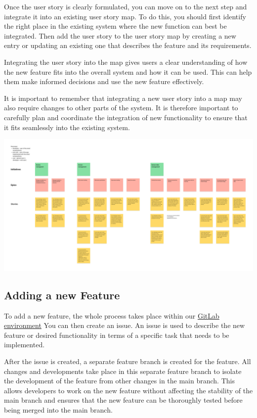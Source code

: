 \documentclass[12pt]{article}
\newcounter{fr}
\begin{document}
Once the user story is clearly formulated, you can move on to the next step and integrate it into an existing user story map. To do this, you should first identify the right place in the existing system where the new function can best be integrated. Then add the user story to the user story map by creating a new entry or updating an existing one that describes the feature and its requirements.

Integrating the user story into the map gives users a clear understanding of how the new feature fits into the overall system and how it can be used. This can help them make informed decisions and use the new feature effectively.

It is important to remember that integrating a new user story into a map may also require changes to other parts of the system. It is therefore important to carefully plan and coordinate the integration of new functionality to ensure that it fits seamlessly into the existing system.

 \includegraphics[width=\textwidth]{user_story_map.png}
 

\subsection{Adding a new Feature}

To add a new feature, the whole process takes place within our \href{https://gitlab.uni-ulm.de/se-anwendungsprojekt-22-23}{GitLab environment}
You can then create an issue. An issue is used to describe the new feature or desired functionality in terms of a specific task that needs to be implemented.

After the issue is created, a separate feature branch is created for the feature. All changes and developments take place in this separate feature branch to isolate the development of the feature from other changes in the main branch. This allows developers to work on the new feature without affecting the stability of the main branch and ensures that the new feature can be thoroughly tested before being merged into the main branch.
\end{document}
